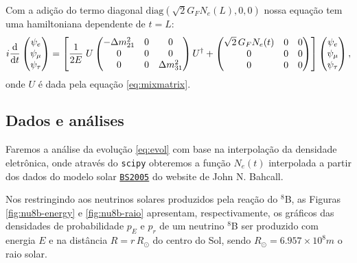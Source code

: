 \documentclass[12pt]{report}
\begin{document}
Com a adição do termo diagonal $\text{diag}(\sqrt{2} G_F N_e(L), 0,0)$ nossa equação tem uma hamiltoniana dependente de $t = L$:
\begin{equation} \label{eq:evol}
i \dv{t}
\begin{pmatrix}
\psi_e \\ \psi_\mu \\ \psi_\tau
\end{pmatrix}
= \qty[ \frac{1}{2E} \; U
\begin{pmatrix}
-\Delta m_{21}^2 & 0 & 0 \\
0 & 0 & 0 \\
0 & 0 & \Delta m_{31}^2 \\
\end{pmatrix}
U^\dagger +
\begin{pmatrix}
\sqrt{2} \, G_F N_e(t) & 0 & 0 \\
0 & 0 & 0 \\
0 & 0 & 0 \\
\end{pmatrix}
]
\begin{pmatrix}
\psi_e \\ \psi_\mu \\ \psi_\tau
\end{pmatrix},
\end{equation}
onde $U$ é dada pela equação \ref{eq:mixmatrix}.


\subsection{Dados e análises} \label{sec:analise}

Faremos a análise da evolução \ref{eq:evol} com base na interpolação da densidade eletrônica, onde através do \texttt{scipy} obteremos a função $N_e(t)$ interpolada a partir dos dados do modelo solar \href{http://www.sns.ias.edu/~jnb/SNdata/sndata.html#bs2005}{\texttt{BS2005}} \cite{bahcall-model} do website de John N. Bahcall.

Nos restringindo aos neutrinos solares produzidos pela reação do $^8$B, as Figuras \ref{fig:nu8b-energy} e \ref{fig:nu8b-raio} apresentam, respectivamente, os gráficos das densidades de probabilidade $p_E$ e $p_r$ de um neutrino $^8$B ser produzido com energia $E$ e na distância $R = r \, R_{\odot}$ do centro do Sol, sendo $R_\odot = 6.957 \times 10^8 \unit{m}$ o raio solar.
\end{document}
